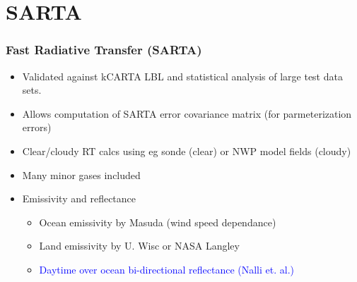 \documentclass[10pt,t]{beamer}
\begin{document}
\begin{frame}
\begin{columns}
  \end{columns}
  
\end{frame}
\section{SARTA}
\begin{frame}\frametitle{Fast Radiative Transfer (SARTA)}
  \begin{itemize}
  \item Validated against kCARTA LBL and statistical analysis of large test
    data sets.
  \item Allows computation of SARTA error covariance matrix (for
    parmeterization errors)
  \item Clear/cloudy RT calcs using eg sonde (clear) or NWP model fields
    (cloudy)
  \item Many minor gases included
  \item Emissivity and reflectance
    \begin{itemize}
    \item Ocean emissivity by Masuda (wind speed dependance)
    \item Land emissivity by U. Wisc or NASA Langley
    \item \textcolor{blue}{Daytime over ocean bi-directional reflectance
        (Nalli et. al.)}
    \end{itemize}
  \end{itemize}
\end{frame}
\end{document}

